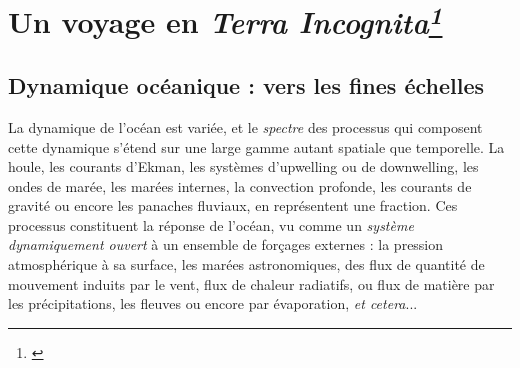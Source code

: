 


\section[Un voyage en \textit{Terra Incognita}]{Un voyage en \textit{Terra Incognita\footnote{\cite{scotti_large_2010}}}}
\subsection{Dynamique océanique : vers les fines échelles}
\label{subsection_intro1}



La dynamique de l'océan est variée, et le \textit{spectre} des processus qui composent cette dynamique s'étend sur une large gamme autant spatiale que temporelle. La houle, les courants d'Ekman, les systèmes d'upwelling ou de downwelling, les ondes de marée, les marées internes, la convection profonde, les courants de gravité ou encore les panaches fluviaux, en représentent une fraction. Ces processus constituent la réponse de l'océan, vu comme un \textit{système dynamiquement ouvert} à un ensemble de forçages externes : la pression atmosphérique à sa surface, les marées astronomiques, des flux de quantité de mouvement induits par le vent, flux de chaleur radiatifs, ou flux de matière par les précipitations, les fleuves ou encore par évaporation, \textit{et cetera}...

